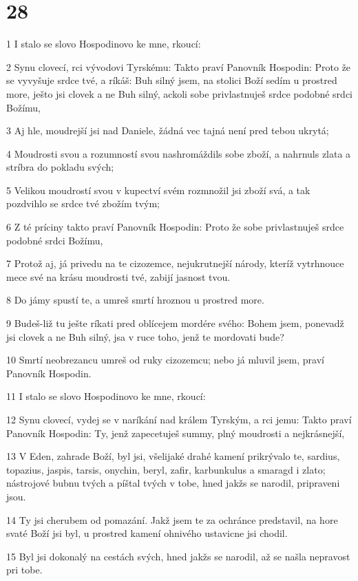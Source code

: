 \chapter{28}

\par 1 I stalo se slovo Hospodinovo ke mne, rkoucí:
\par 2 Synu clovecí, rci vývodovi Tyrskému: Takto praví Panovník Hospodin: Proto že se vyvyšuje srdce tvé, a ríkáš: Buh silný jsem, na stolici Boží sedím u prostred more, ješto jsi clovek a ne Buh silný, ackoli sobe privlastnuješ srdce podobné srdci Božímu,
\par 3 Aj hle, moudrejší jsi nad Daniele, žádná vec tajná není pred tebou ukrytá;
\par 4 Moudrosti svou a rozumností svou nashromáždils sobe zboží, a nahrnuls zlata a stríbra do pokladu svých;
\par 5 Velikou moudrostí svou v kupectví svém rozmnožil jsi zboží svá, a tak pozdvihlo se srdce tvé zbožím tvým;
\par 6 Z té príciny takto praví Panovník Hospodin: Proto že sobe privlastnuješ srdce podobné srdci Božímu,
\par 7 Protož aj, já privedu na te cizozemce, nejukrutnejší národy, kteríž vytrhnouce mece své na krásu moudrosti tvé, zabijí jasnost tvou.
\par 8 Do jámy spustí te, a umreš smrtí hroznou u prostred more.
\par 9 Budeš-liž tu ješte ríkati pred oblícejem mordére svého: Bohem jsem, ponevadž jsi clovek a ne Buh silný, jsa v ruce toho, jenž te mordovati bude?
\par 10 Smrtí neobrezancu umreš od ruky cizozemcu; nebo já mluvil jsem, praví Panovník Hospodin.
\par 11 I stalo se slovo Hospodinovo ke mne, rkoucí:
\par 12 Synu clovecí, vydej se v naríkání nad králem Tyrským, a rci jemu: Takto praví Panovník Hospodin: Ty, jenž zapecetuješ summy, plný moudrosti a nejkrásnejší,
\par 13 V Eden, zahrade Boží, byl jsi, všelijaké drahé kamení prikrývalo te, sardius, topazius, jaspis, tarsis, onychin, beryl, zafir, karbunkulus a smaragd i zlato; nástrojové bubnu tvých a píštal tvých v tobe, hned jakžs se narodil, pripraveni jsou.
\par 14 Ty jsi cherubem od pomazání. Jakž jsem te za ochránce predstavil, na hore svaté Boží jsi byl, u prostred kamení ohnivého ustavicne jsi chodil.
\par 15 Byl jsi dokonalý na cestách svých, hned jakžs se narodil, až se našla nepravost pri tobe.
